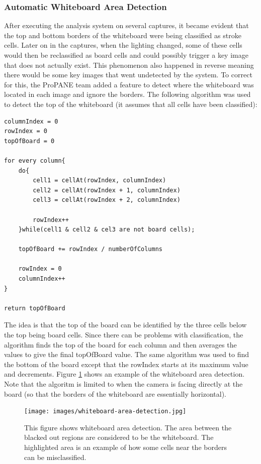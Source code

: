 \documentclass[]{article}
\begin{document}
			\subsubsection{Automatic Whiteboard Area Detection}
				After executing the analysis system on several captures, it became evident that the top and bottom borders of the whiteboard were being classified as stroke cells. Later on in the captures, when the lighting changed, some of these cells would then be reclassified as board cells and could possibly trigger a key image that does not actually exist. This phenomenon also happened in reverse meaning there would be some key images that went undetected by the system. To correct for this, the ProPANE team added a feature to detect where the whiteboard was located in each image and ignore the borders. The following algorithm was used to detect the top of the whiteboard (it assumes that all cells have been classified):
				\begin{lstlisting}
columnIndex = 0
rowIndex = 0
topOfBoard = 0

for every column{
	do{
		cell1 = cellAt(rowIndex, columnIndex)
		cell2 = cellAt(rowIndex + 1, columnIndex)
		cell3 = cellAt(rowIndex + 2, columnIndex)
		
		rowIndex++
	}while(cell1 & cell2 & cel3 are not board cells);
	
	topOfBoard += rowIndex / numberOfColumns
	
	rowIndex = 0
	columnIndex++
}		

return topOfBoard
				\end{lstlisting}
				The idea is that the top of the board can be identified by the three cells below the top being board cells. Since there can be problems with classification, the algorithm finds the top of the board for each column and then averages the values to give the final topOfBoard value. The same algorithm was used to find the bottom of the board except that the rowIndex starts at its maximum value and decrements. Figure \ref{img:whiteboard-area-detection} shows an example of the whiteboard area detection. Note that the algoritm is limited to when the camera is facing directly at the board (so that the borders of the whiteboard are essentially horizontal). 
				
				\begin{figure}[h]
					\centering
					\texttt{[image: images/whiteboard-area-detection.jpg]}
					\caption{This figure shows whiteboard area detection. The area between the blacked out regions are considered to be the whiteboard. The highlighted area is an example of how some cells near the borders can be misclassified. }
					\label{img:whiteboard-area-detection}
				\end{figure}
						
\end{document}
